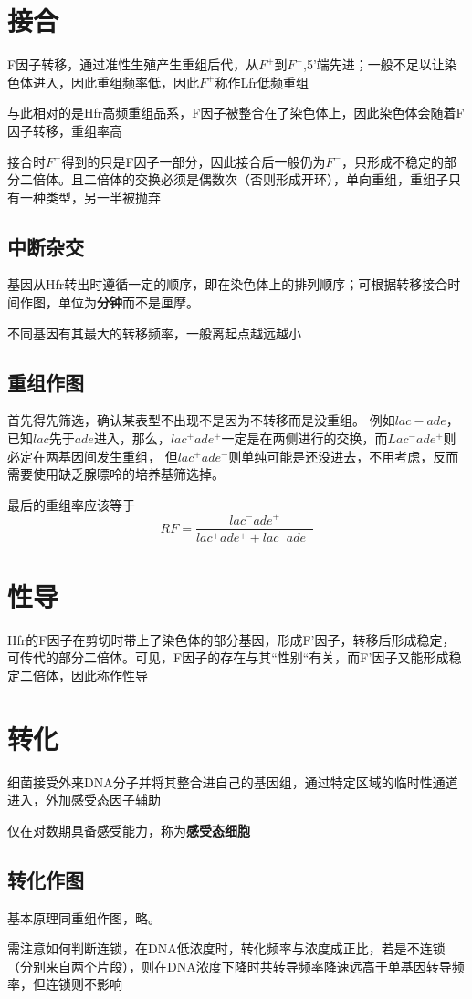 \documentclass[a4paper, 12pt]{report}
\begin{document}
\section{接合}
F因子转移，通过准性生殖产生重组后代，从\(F^+\)到\(F^-\),5'端先进；一般不足以让染色体进入，因此重组频率低，因此\(F^+\)称作Lfr低频重组

与此相对的是Hfr高频重组品系，F因子被整合在了染色体上，因此染色体会随着F因子转移，重组率高

接合时\(F^-\)得到的只是F因子一部分，因此接合后一般仍为\(F^-\)，只形成不稳定的部分二倍体。且二倍体的交换必须是偶数次（否则形成开环），单向重组，重组子只有一种类型，另一半被抛弃
\subsection{中断杂交}
基因从Hfr转出时遵循一定的顺序，即在染色体上的排列顺序；可根据转移接合时间作图，单位为\textbf{分钟}而不是厘摩。

不同基因有其最大的转移频率，一般离起点越远越小
\subsection{重组作图}
首先得先筛选，确认某表型不出现不是因为不转移而是没重组。
例如\(lac-ade\)，已知\(lac\)先于\(ade\)进入，那么，\(lac^+ade^+\)一定是在两侧进行的交换，而\(Lac^-ade^+\)则必定在两基因间发生重组，
但\(lac^+ade^-\)则单纯可能是还没进去，不用考虑，反而需要使用缺乏腺嘌呤的培养基筛选掉。

最后的重组率应该等于
\[
    RF=\dfrac{lac^-ade^+}{lac^+ade^++lac^-ade^+}
\]
\section{性导}
Hfr的F因子在剪切时带上了染色体的部分基因，形成F'因子，转移后形成稳定，可传代的部分二倍体。可见，F因子的存在与其“性别“有关，而F'因子又能形成稳定二倍体，因此称作性导
\section{转化}
细菌接受外来DNA分子并将其整合进自己的基因组，通过特定区域的临时性通道进入，外加感受态因子辅助

仅在对数期具备感受能力，称为\textbf{感受态细胞}
\subsection{转化作图}
基本原理同重组作图，略。

需注意如何判断连锁，在DNA低浓度时，转化频率与浓度成正比，若是不连锁（分别来自两个片段），则在DNA浓度下降时共转导频率降速远高于单基因转导频率，但连锁则不影响
\end{document}
